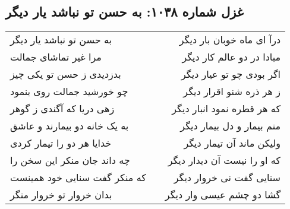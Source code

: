 \begin{center}
\section*{غزل شماره ۱۰۳۸: به حسن تو نباشد یار دیگر}
\label{sec:1038}
\begin{longtable}{l p{0.5cm} r}
به حسن تو نباشد یار دیگر
&&
درآ ای ماه خوبان بار دیگر
\\
مرا غیر تماشای جمالت
&&
مبادا در دو عالم کار دیگر
\\
بدزدیدی ز حسن تو یکی چیز
&&
اگر بودی چو تو عیار دیگر
\\
چو خورشید جمالت روی بنمود
&&
ز هر ذره شنو اقرار دیگر
\\
زهی دریا که آگندی ز گوهر
&&
که هر قطره نمود انبار دیگر
\\
به یک خانه دو بیمارند و عاشق
&&
منم بیمار و دل بیمار دیگر
\\
خدایا هر دو را تیمار کردی
&&
ولیکن ماند آن تیمار دیگر
\\
چه داند جان منکر این سخن را
&&
که او را نیست آن دیدار دیگر
\\
که منکر گفت سنایی خود همینست
&&
سنایی گفت نی خروار دیگر
\\
بدان خروار تو خروار منگر
&&
گشا دو چشم عیسی وار دیگر
\\
\end{longtable}
\end{center}
